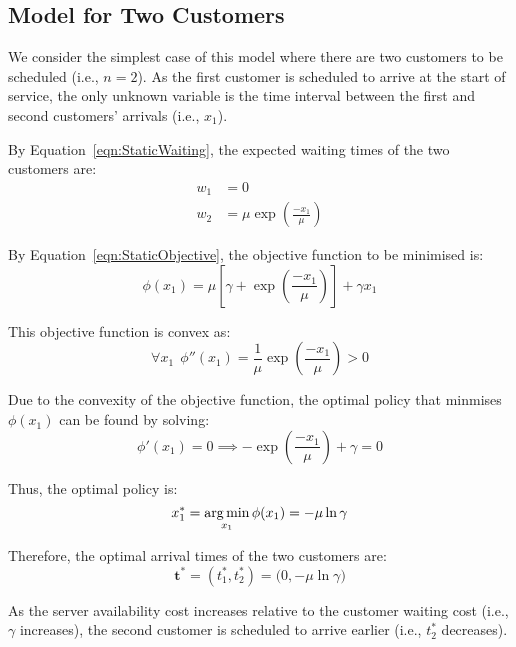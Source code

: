 \subsection{Model for Two Customers}
\label{sec:StaticTwoCust}

We consider the simplest case of this model where there are two customers to be scheduled (i.e., $n = 2$). As the first customer is scheduled to arrive at the start of service, the only unknown variable is the time interval between the first and second customers' arrivals (i.e., $x_{1}$).

By Equation~\ref{eqn:StaticWaiting}, the expected waiting times of the two customers are:
\begin{align}
	w_{1} & = 0 \\
	w_{2} & = \mu \exp \left( \frac{- x_{1}}{\mu} \right)
\end{align}

By Equation~\ref{eqn:StaticObjective}, the objective function to be minimised is:
\begin{equation}
	\phi (x_{1}) = \mu \left[ \gamma + \exp \left( \frac{- x_{1}}{\mu} \right) \right] + \gamma x_{1}
\end{equation}

This objective function is convex as:
\begin{equation}
	\forall x_{1} \ \ \phi'' (x_{1}) = \frac{1}{\mu} \exp \left( \frac{- x_{1}}{\mu} \right) > 0
\end{equation}

Due to the convexity of the objective function, the optimal policy that minmises $\phi (x_{1})$ can be found by solving:
\begin{equation}
	\phi' (x_{1}) = 0 \implies - \exp \left( \frac{- x_{1}}{\mu} \right) + \gamma = 0
\end{equation}

Thus, the optimal policy is:
\begin{equation}
	x_{1}^{*} = \operatorname*{arg\,min}_{x_{1}} \phi (x_{1}) = - \mu \ln \gamma
\end{equation}

Therefore, the optimal arrival times of the two customers are:
\begin{equation}
	\mathbf{t}^{*} = \left( t_{1}^{*}, t_{2}^{*} \right) = \Big( 0, - \mu \ln \gamma \Big)
\end{equation}

As the server availability cost increases relative to the customer waiting cost (i.e., $\gamma$ increases), the second customer is scheduled to arrive earlier (i.e., $t_{2}^{*}$ decreases).

